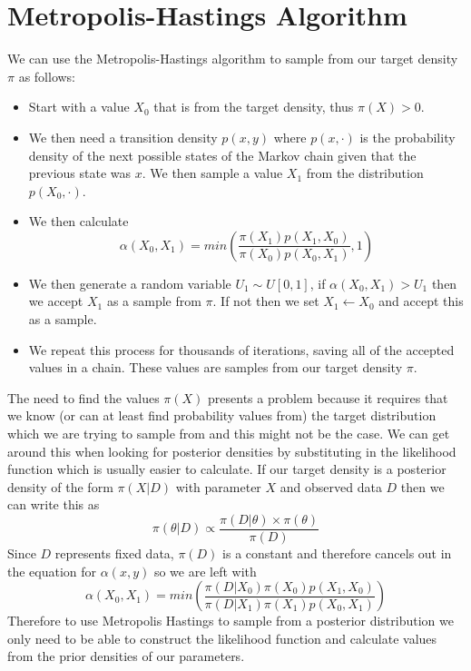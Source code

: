 \documentclass[11pt,a4paper]{report}
\begin{document}
\section{Metropolis-Hastings Algorithm}
We can use the Metropolis-Hastings algorithm to sample from our target density $\pi$ as follows:
\begin{itemize}
\item Start with a value $X_0$ that is from the target density, thus $\pi(X) > 0$.
\item We then need a transition density $p(x,y)$ where $p(x, \cdot)$ is the probability density of the next possible states of the Markov chain given that the previous state was $x$. We then sample a value $X_1$ from the distribution $p(X_0,\cdot)$.
\item We then calculate 
\[ \alpha(X_0,X_1) = min\left(\frac{\pi(X_1)p(X_1,X_0)}{\pi(X_0)p(X_0,X_1)},1\right) \]
\item We then generate a random variable $U_1 \sim U[0,1]$, if $\alpha(X_0,X_1) > U_1$ then we accept $X_1$ as a sample from $\pi$. If not then we set $X_1 \leftarrow X_0$ and accept this as a sample.
\item We repeat this process for thousands of iterations, saving all of the accepted values in a chain. These values are samples from our target density $\pi$.
\end{itemize}
The need to find the values $\pi(X)$ presents a problem because it requires that we know (or can at least find probability values from) the target distribution which we are trying to sample from and this might not be the case. We can get around this when looking for posterior densities by substituting in the likelihood function which is usually easier to calculate. If our target density is a posterior density of the form $\pi(X | D)$ with parameter $X$ and observed data $D$ then we can write this as
\[ \pi(\theta | D) \propto \frac{\pi(D | \theta) \times \pi(\theta)}{\pi(D)} \]
Since $D$ represents fixed data, $\pi(D)$ is a constant and therefore cancels out in the equation for $\alpha(x,y)$ so we are left with
\[ \alpha(X_0,X_1) = min\left(\frac{\pi(D | X_0)\pi(X_0)p(X_1,X_0)}{\pi(D | X_1)\pi(X_1)p(X_0,X_1)}\right) \]
Therefore to use Metropolis Hastings to sample from a posterior distribution we only need to be able to construct the likelihood function and calculate values from the prior densities of our parameters.
\end{document}
